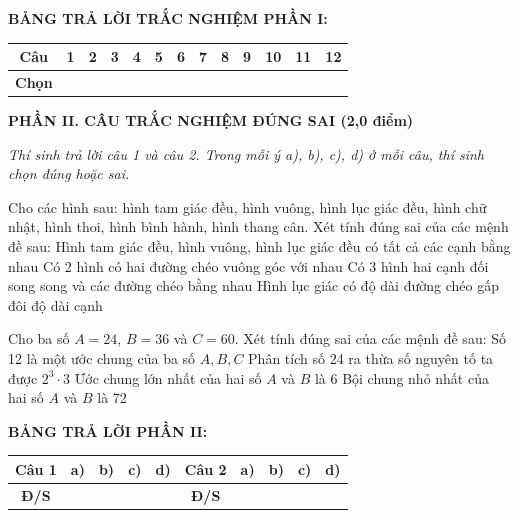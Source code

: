 \documentclass[12pt,a4paper]{article}
\begin{document}
\vspace{1mm}
\noindent\textbf{BẢNG TRẢ LỜI TRẮC NGHIỆM PHẦN I:}
\begin{center}
\begin{tabular}{|c|c|c|c|c|c|c|c|c|c|c|c|c|}
\hline
\textbf{Câu} & \textbf{1} & \textbf{2} & \textbf{3} & \textbf{4} & \textbf{5} & \textbf{6} & \textbf{7} & \textbf{8} & \textbf{9} & \textbf{10} & \textbf{11} & \textbf{12} \\
\hline
\textbf{Chọn} & \rule{0pt}{0.65cm} & & & & & & & & & & & \\
\hline
\end{tabular}
\end{center}
\vspace{2mm}

\setcounter{ex}{0}
\noindent\textbf{\large PHẦN II. CÂU TRẮC NGHIỆM ĐÚNG SAI (2,0 điểm)}

\textit{Thí sinh trả lời câu 1 và câu 2. Trong mỗi ý a), b), c), d) ở mỗi câu, thí sinh chọn đúng hoặc sai.}

\vspace{1mm}
\begin{ex}
Cho các hình sau: hình tam giác đều, hình vuông, hình lục giác đều, hình chữ nhật, hình thoi, hình bình hành, hình thang cân. Xét tính đúng sai của các mệnh đề sau:
\choiceTF
{\True Hình tam giác đều, hình vuông, hình lục giác đều có tất cả các cạnh bằng nhau}
{\True Có 2 hình có hai đường chéo vuông góc với nhau}
{\True Có 3 hình hai cạnh đối song song và các đường chéo bằng nhau}
{Hình lục giác có độ dài đường chéo gấp đôi độ dài cạnh}
\end{ex}

\begin{ex}
Cho ba số $A = 24$, $B = 36$ và $C = 60$. Xét tính đúng sai của các mệnh đề sau:
\choiceTF
{\True Số 12 là một ước chung của ba số $A, B, C$}
{\True Phân tích số 24 ra thừa số nguyên tố ta được $2^3 \cdot 3$}
{Ước chung lớn nhất của hai số $A$ và $B$ là 6}
{\True Bội chung nhỏ nhất của hai số $A$ và $B$ là 72}
\end{ex}


\noindent\textbf{BẢNG TRẢ LỜI PHẦN II:}
\begin{center}
\begin{tabular}{|c|c|c|c|c||c|c|c|c|c|}
\hline
\textbf{Câu 1} & \textbf{a)} & \textbf{b)} & \textbf{c)} & \textbf{d)} & \textbf{Câu 2} & \textbf{a)} & \textbf{b)} & \textbf{c)} & \textbf{d)} \\
\hline
\textbf{Đ/S} & \rule{0pt}{0.6cm} & & & & \textbf{Đ/S} & & & & \\
\hline
\end{tabular}
\end{center}
\vspace{2mm}
\end{document}
